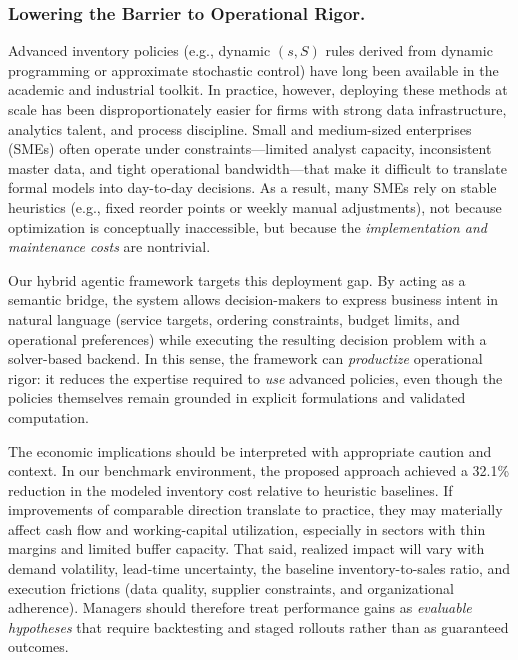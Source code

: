 \documentclass[mnsc,nonblindrev]{informs3_hide}
\begin{document}
\subsubsection*{Lowering the Barrier to Operational Rigor.}
Advanced inventory policies (e.g., dynamic $(s, S)$ rules derived from dynamic programming or approximate stochastic control) have long been available in the academic and industrial toolkit. In practice, however, deploying these methods at scale has been disproportionately easier for firms with strong data infrastructure, analytics talent, and process discipline. Small and medium-sized enterprises (SMEs) often operate under constraints---limited analyst capacity, inconsistent master data, and tight operational bandwidth---that make it difficult to translate formal models into day-to-day decisions. As a result, many SMEs rely on stable heuristics (e.g., fixed reorder points or weekly manual adjustments), not because optimization is conceptually inaccessible, but because the \emph{implementation and maintenance costs} are nontrivial.

Our hybrid agentic framework targets this deployment gap. By acting as a semantic bridge, the system allows decision-makers to express business intent in natural language (service targets, ordering constraints, budget limits, and operational preferences) while executing the resulting decision problem with a solver-based backend. In this sense, the framework can \emph{productize} operational rigor: it reduces the expertise required to \emph{use} advanced policies, even though the policies themselves remain grounded in explicit formulations and validated computation.

The economic implications should be interpreted with appropriate caution and context. In our benchmark environment, the proposed approach achieved a 32.1\% reduction in the modeled inventory cost relative to heuristic baselines. If improvements of comparable direction translate to practice, they may materially affect cash flow and working-capital utilization, especially in sectors with thin margins and limited buffer capacity. That said, realized impact will vary with demand volatility, lead-time uncertainty, the baseline inventory-to-sales ratio, and execution frictions (data quality, supplier constraints, and organizational adherence). Managers should therefore treat performance gains as \emph{evaluable hypotheses} that require backtesting and staged rollouts rather than as guaranteed outcomes.
\end{document}
